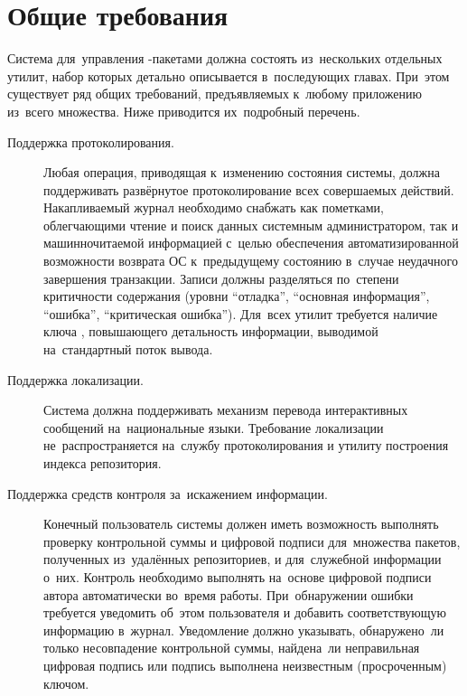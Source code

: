 
\section{Общие требования}

Система для~управления -пакетами должна состоять из~нескольких отдельных утилит,
набор которых детально описывается в~последующих главах.
При~этом существует ряд общих требований, предъявляемых к~любому приложению из~всего множества.
Ниже приводится их~подробный перечень.

\begin{description}

\item[Поддержка протоколирования.]
Любая операция, приводящая к~изменению состояния системы, 
должна поддерживать развёрнутое протоколирование всех совершаемых  действий.
Накапливаемый журнал необходимо снабжать как пометками, облегчающими чтение и поиск данных системным администратором,
так и машинночитаемой информацией с~целью обеспечения автоматизированной возможности 
возврата ОС к~предыдущему состоянию в~случае неудачного завершения транзакции. 
Записи должны разделяться по~степени критичности содержания 
(уровни ``отладка'', ``основная информация'', ``ошибка'', ``критическая ошибка'').
Для~всех утилит требуется наличие ключа ,
 повышающего детальность информации,
выводимой на~стандартный поток вывода.

\item [Поддержка локализации.]
Система должна поддерживать механизм перевода интерактивных сообщений на~национальные языки.
Требование локализации не~распространяется на~службу протоколирования и утилиту построения индекса репозитория.

\item[Поддержка средств контроля за~искажением информации.]
Конечный пользователь системы должен иметь возможность выполнять проверку контрольной суммы и цифровой подписи 
для~множества пакетов, полученных из~удалённых репозиториев, и для~служебной информации о~них.
Контроль необходимо выполнять на~основе цифровой подписи   автора  автоматически  во~время работы.
При~обнаружении ошибки требуется уведомить об~этом пользователя и добавить соответствующую информацию в~журнал.
Уведомление должно указывать, обнаружено~ли только несовпадение контрольной суммы, 
найдена~ли неправильная цифровая подпись или подпись выполнена неизвестным (просроченным) ключом.


\end{description}
